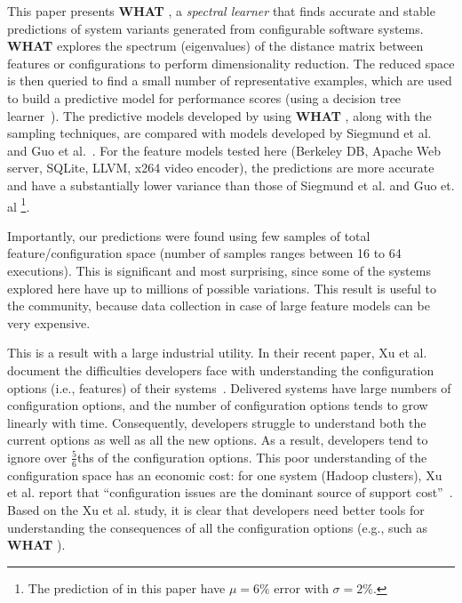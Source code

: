\documentclass{sig-alternative}
\newcommand{\what}{{\bf WHAT }}
\begin{document}
This paper presents \what, a {\em spectral learner}     that finds 
accurate and  stable predictions of system variants generated from configurable software systems.
\what explores the spectrum (eigenvalues) of the distance matrix
between  features or configurations to perform dimensionality reduction. The reduced
space is then queried to find a small number of representative examples, which are used to
build a predictive model for performance scores (using a decision tree learner~\cite{breiman1984}). The predictive models developed by using \what, along with the sampling techniques, are compared with models developed by Siegmund et al.~\cite{siegmund2012predicting} and Guo et al.~\cite{guo2013variability}. 
For the feature models tested here (Berkeley DB, Apache Web server, SQLite, LLVM, x264 video encoder),
the  predictions are more accurate and have a substantially lower variance than those of Siegmund et al. and Guo et. al \footnote{The prediction of in this paper have $\mu=6\%$ error with $\sigma=2\%$.}.


Importantly, our predictions were found using few samples of total feature/configuration space
(number of samples ranges between 16 to 64 executions).
This is significant and most surprising,  since some of the systems explored here have up
to millions of possible variations. This result is useful to the community, because data collection in case 
of large feature models can be very expensive.

This is a result with a large industrial utility.
In their recent paper, Xu et al. document the  difficulties developers face
with understanding  the configuration options (i.e., features) of their systems~\cite{xu2015hey}.
Delivered systems have large numbers of configuration options, and the number of  configuration options tends to grow linearly
with time. Consequently, developers  struggle to understand both the current options as well as all the new options.
As a result, developers tend to ignore over $\frac{5}{6}$ths of the configuration options. 
This poor understanding of the configuration space has an economic cost:  for one system (Hadoop clusters),  Xu et al. report that ``configuration
issues are the dominant source of support cost''~\cite{xu2015hey}. 
Based on the Xu et al. study, it is clear that developers need better tools for understanding the 
consequences of all the configuration options (e.g., such as \what).
\end{document}
